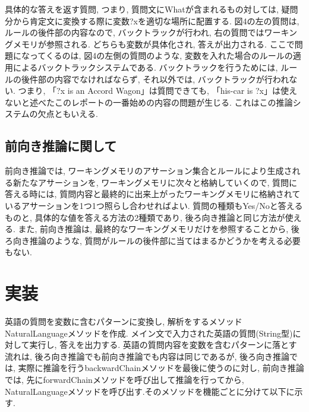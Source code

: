 \documentclass[uplatex,12pt]{jsarticle}
\begin{document}
具体的な答えを返す質問, つまり, 質問文にWhatが含まれるもの対しては, 疑問分から肯定文に変換する際に変数?xを適切な場所に配置する. 図4の左の質問は, ルールの後件部の内容なので, バックトラックが行われ, 右の質問ではワーキングメモリが参照される. どちらも変数が具体化され, 答えが出力される. ここで問題になってくるのは, 図4の左側の質問のような, 変数を入れた場合のルールの適用によるバックトラックシステムである. バックトラックを行うためには, ルールの後件部の内容でなければならず, それ以外では, バックトラックが行われない. つまり, 「?x is an Accord Wagon」は質問できても, 「his-car is ?x」は使えないと述べたこのレポートの一番始めの内容の問題が生じる. これはこの推論システムの欠点ともいえる.

\subsection{前向き推論に関して}
前向き推論では, ワーキングメモリのアサーション集合とルールにより生成される新たなアサーションを, ワーキングメモリに次々と格納していくので, 質問に答える時には, 質問内容と最終的に出来上がったワーキングメモリに格納されているアサーションを1つ1つ照らし合わせればよい.
質問の種類もYes/Noと答えるものと, 具体的な値を答える方法の2種類であり, 後ろ向き推論と同じ方法が使える. また, 前向き推論は, 最終的なワーキングメモリだけを参照することから, 後ろ向き推論のような, 質問がルールの後件部に当てはまるかどうかを考える必要もない.

\section{実装}
英語の質問を変数に含むパターンに変換し, 解析をするメソッドNaturalLanguageメソッドを作成. メイン文で入力された英語の質問(String型)に対して実行し, 答えを出力する. 英語の質問内容を変数を含むパターンに落とす流れは, 後ろ向き推論でも前向き推論でも内容は同じであるが, 後ろ向き推論では, 実際に推論を行うbackwardChainメソッドを最後に使うのに対し, 前向き推論では, 先にforwardChainメソッドを呼び出して推論を行ってから, NaturalLanguageメソッドを呼び出す.そのメソッドを機能ごとに分けて以下に示す.
\end{document}

